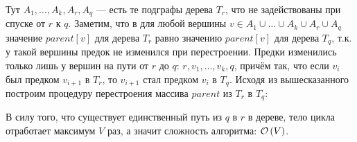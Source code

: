 Тут $A_1,\ldots,A_k,A_r,A_q$ --- есть те подграфы дерева $T_r$, что не задействованы при спуске от $r$ к $q$.
Заметим, что в для любой вершины $v \in A_1\cup \ldots \cup A_k \cup A_r \cup A_q$ значение $parent[v]$ для дерева $T_r$ равно
значению $parent[v]$ для дерева $T_q$, т.к. у такой вершины предок не изменился при перестроении. Предки изменились только лишь 
у вершин на пути от $r$ до $q$: $r,v_1,\ldots,v_k,q$, причём так, что если $v_i$ был предком $v_{i+1}$ в $T_r$, то $v_{i+1}$
стал предком $v_{i}$ в $T_q$. Исходя из вышесказанного построим процедуру перестроения массива $parent$ из $T_r$ в $T_q$:

\begin{algorithmic}
	\EndWhile
\EndProcedure
\end{algorithmic}
В силу того, что существует единственный путь из $q$ в $r$ в дереве, тело цикла отработает максимум $V$ раз, а значит сложность алгоритма: $\mathcal{O}\left(V\right)$. \xqed

